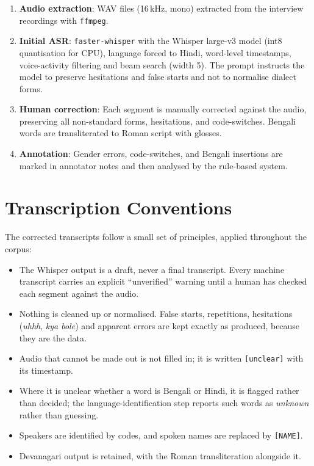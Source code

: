 \documentclass[11pt,a4paper]{report}
\begin{document}
\begin{enumerate}
  \item \textbf{Audio extraction}: WAV files (16\,kHz, mono) extracted from the interview recordings with \texttt{ffmpeg}.
  \item \textbf{Initial ASR}: \texttt{faster-whisper} with the Whisper large-v3 model (int8 quantisation for CPU), language forced to Hindi, word-level timestamps, voice-activity filtering and beam search (width 5). The prompt instructs the model to preserve hesitations and false starts and not to normalise dialect forms.
  \item \textbf{Human correction}: Each segment is manually corrected against the audio, preserving all non-standard forms, hesitations, and code-switches. Bengali words are transliterated to Roman script with glosses.
  \item \textbf{Annotation}: Gender errors, code-switches, and Bengali insertions are marked in annotator notes and then analysed by the rule-based system.
\end{enumerate}

\section{Transcription Conventions}

The corrected transcripts follow a small set of principles, applied throughout the corpus:

\begin{itemize}
  \item The Whisper output is a draft, never a final transcript. Every machine transcript carries an explicit ``unverified'' warning until a human has checked each segment against the audio.
  \item Nothing is cleaned up or normalised. False starts, repetitions, hesitations (\textit{uhhh}, \textit{kya bole}) and apparent errors are kept exactly as produced, because they are the data.
  \item Audio that cannot be made out is not filled in; it is written \texttt{[unclear]} with its timestamp.
  \item Where it is unclear whether a word is Bengali or Hindi, it is flagged rather than decided; the language-identification step reports such words as \emph{unknown} rather than guessing.
  \item Speakers are identified by codes, and spoken names are replaced by \texttt{[NAME]}.
  \item Devanagari output is retained, with the Roman transliteration alongside it.
\end{itemize}
\end{document}
